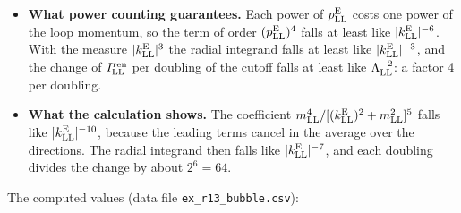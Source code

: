\documentclass[
  10pt,
]{article}
\providecommand{\tightlist}{%
  \setlength{\itemsep}{0pt}\setlength{\parskip}{0pt}}
\begin{document}
\begin{itemize}
  \begin{itemize}
  \tightlist
  \item
    \textbf{What power counting guarantees.} Each power of
    \(p^{\rm E}_{\rm LL}\) costs one power of the loop momentum, so the
    term of order \((p^{\rm E}_{\rm LL})^4\) falls at least like
    \(\lvert k^{\rm E}_{\rm LL}\rvert^{-6}\). With the measure
    \(\lvert k^{\rm E}_{\rm LL}\rvert^3\) the radial integrand falls at
    least like \(\lvert k^{\rm E}_{\rm LL}\rvert^{-3}\), and the change
    of \(I^{\rm ren}_{\rm LL}\) per doubling of the cutoff falls at
    least like \(\Lambda_{\rm LL}^{-2}\): a factor 4 per doubling.
  \item
    \textbf{What the calculation shows.} The coefficient
    \(m_{\rm LL}^4/[(k^{\rm E}_{\rm LL})^2+m_{\rm LL}^2]^5\) falls like
    \(\lvert k^{\rm E}_{\rm LL}\rvert^{-10}\), because the leading terms
    cancel in the average over the directions. The radial integrand then
    falls like \(\lvert k^{\rm E}_{\rm LL}\rvert^{-7}\), and each
    doubling divides the change by about \(2^6=64\).
  \end{itemize}
\end{itemize}

The computed values (data file \texttt{ex\_r13\_bubble.csv}):
\end{document}
